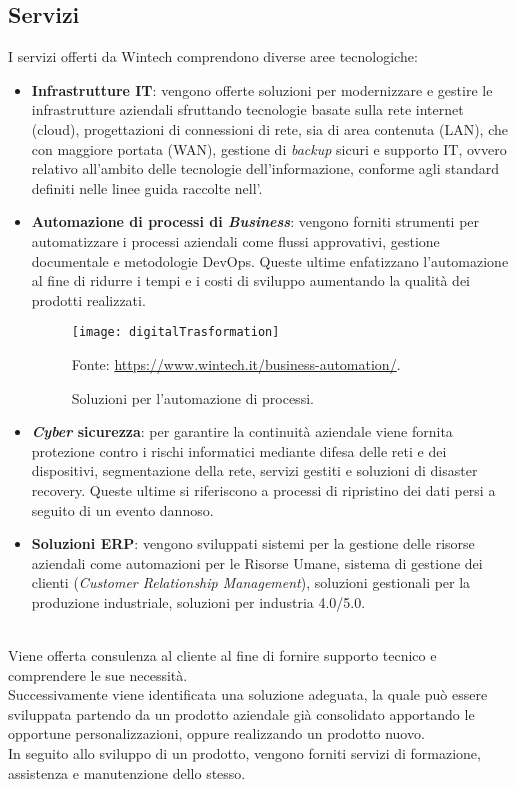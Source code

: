 \subsection{Servizi}
I servizi offerti da Wintech comprendono diverse aree tecnologiche:
\begin{itemize}
	\item \textbf{Infrastrutture \gls{IT}}: vengono offerte soluzioni per modernizzare e gestire le infrastrutture aziendali sfruttando tecnologie basate sulla rete internet (\gls{cloud}), progettazioni di connessioni di rete, sia di area contenuta (\gls{LAN}), che con maggiore portata (\gls{WAN}), gestione di \emph{backup} sicuri e supporto \gls{IT}, ovvero relativo all'ambito delle tecnologie dell'informazione, conforme agli standard definiti nelle linee guida raccolte nell'. 
	\item \textbf{Automazione di processi di \emph{Business}}: vengono forniti strumenti per automatizzare i processi aziendali come flussi approvativi, gestione documentale e metodologie \gls{DevOps}. Queste ultime enfatizzano l'automazione al fine di ridurre i tempi e i costi di sviluppo aumentando la qualità dei prodotti realizzati.  
	\begin{figure}[htbp] 
        \centering 
        \texttt{[image: digitalTrasformation]}
        \caption{Soluzioni per l'automazione di processi.} 
        \label{fig:digitalTransformation}
        Fonte: \url{https://www.wintech.it/business-automation/}.
    \end{figure}
    \item \textbf{\emph{Cyber} sicurezza}: per garantire la continuità aziendale viene fornita protezione contro i rischi informatici mediante difesa delle reti e dei dispositivi, segmentazione della rete, servizi gestiti e soluzioni di \gls{disaster recovery}. Queste ultime si riferiscono a processi di ripristino dei dati persi a seguito di un evento dannoso.
	\item \textbf{Soluzioni \gls{ERP}}: vengono sviluppati sistemi per la gestione delle risorse aziendali come automazioni per le Risorse Umane, sistema di gestione dei clienti (\emph{Customer Relationship Management}), soluzioni gestionali per la produzione industriale, soluzioni per industria 4.0/5.0.\\\\
\end{itemize}
Viene offerta consulenza al cliente al fine di fornire supporto tecnico e comprendere le sue necessità.\\
Successivamente viene identificata una soluzione adeguata, la quale può essere sviluppata partendo da un prodotto aziendale già consolidato apportando le opportune personalizzazioni, oppure realizzando un prodotto nuovo.\\
In seguito allo sviluppo di un prodotto, vengono forniti servizi di formazione, assistenza e manutenzione dello stesso.\\


